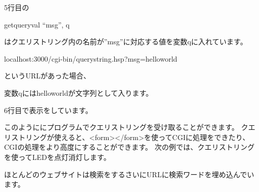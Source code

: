 \documentclass[text06.tex]{subfiles}
\begin{document}
\bigskip

5行目の

getqueryval “msg”, q

はクエリストリング内の名前が”msg”に対応する値を変数qに入れています。

localhost:3000/cgi-bin/querystring.hsp?msg=helloworld

というURLがあった場合、

変数qにはhelloworldが文字列として入ります。

6行目で表示をしています。

このようににプログラムでクエリストリングを受け取ることができます。
クエリストリングが使えると、{\textless}form{\textgreater}{\textless}/form{\textgreater}を使ってCGIに処理をできたり、CGIの処理をより高度にすることができます。
次の例では、クエリストリングを使ってLEDを点灯消灯します。

ほとんどのウェブサイトは検索をするさいにURLに検索ワードを埋め込んでいます。

\begin{tcolorbox}[title=\useOmetoi,breakable]\label{Q:dynamicPage}
  \begin{enumerate}
  \end{enumerate}
\end{tcolorbox}

\clearpage

\end{document}

